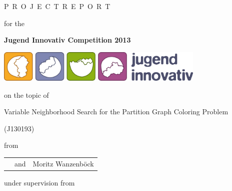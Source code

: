 \documentclass[paper=a4,fontsize=12pt]{scrartcl}
\begin{document}
\begin{titlepage}
\begin{center}
\vspace*{\fill}
{\Large P}\ {\large R\ O\ J\ E\ C\ T\ R\ E\ P\ O\ R\ T}

\vspace{5mm}

for the 

\vspace{5mm}

{\Large\bfseries Jugend Innovativ Competition 2013}

\vspace{5mm}

\includegraphics[width=10cm]{jugendinnovativ.png}

\vspace{5mm}

on the topic of 

\vspace{5mm}

{\Huge Variable Neighborhood Search for the Partition Graph Coloring Problem}

\vspace{1mm}

(J130193)

\vspace{5mm}

from

\vspace{5mm}

\begin{tabular}{>{\raggedright\arraybackslash}p{}c>{\raggedleft\arraybackslash}p{}}
{\large Lorenz Leutgeb} & and & {\large Moritz Wanzenböck} \\
\end{tabular}

\vspace{5mm}

under supervision from


\end{center}
\end{titlepage}
\end{document}

